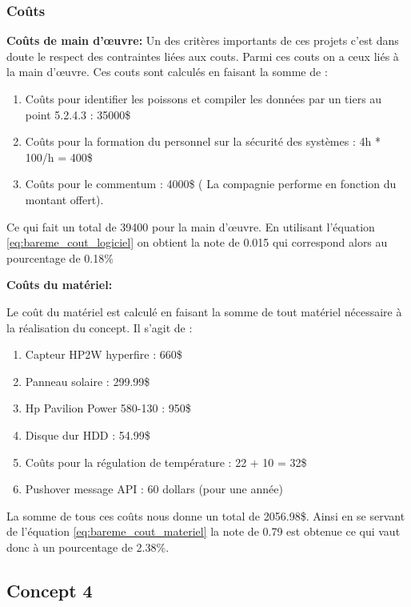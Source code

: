 \subsubsection{Coûts}


\textbf{Coûts de main d’œuvre:} Un des critères importants de ces projets c’est dans doute le respect des contraintes liées aux couts. Parmi ces couts on a ceux liés à la main d’œuvre. Ces couts sont calculés en faisant la somme de : 
\begin{enumerate}
    \item Coûts pour identifier les poissons et compiler les données par un tiers au point 5.2.4.3 : 35000\$
    \item Coûts pour la formation du personnel sur la sécurité des systèmes : 4h * 100/h = 400\$
    \item Coûts pour le commentum : 4000\$ ( La compagnie performe en fonction du montant offert).
\end{enumerate}

Ce qui fait un total de 39400 pour la main d’œuvre. En utilisant l’équation \ref{eq:bareme_cout_logiciel} on obtient la note de 0.015 qui correspond alors au pourcentage de 0.18\%
\vspace{5mm}

\textbf{Coûts du matériel:}

Le coût du matériel est calculé en faisant la somme de tout matériel nécessaire à la réalisation du concept. Il s’agit de :
\begin{enumerate}
    \item Capteur HP2W hyperfire : 660\$
    \item Panneau solaire : 299.99\$
    \item Hp Pavilion Power 580-130 : 950\$
    \item Disque dur HDD : 54.99\$
    \item Coûts pour la régulation de température : 22 + 10 = 32\$
    \item Pushover message API : 60 dollars (pour une année)
\end{enumerate}

La somme de tous ces coûts nous donne un total de 2056.98\$. Ainsi en se servant de l’équation \ref{eq:bareme_cout_materiel} la note de 0.79 est obtenue ce qui vaut donc à un pourcentage de 2.38\%.


\subsection{Concept 4}


